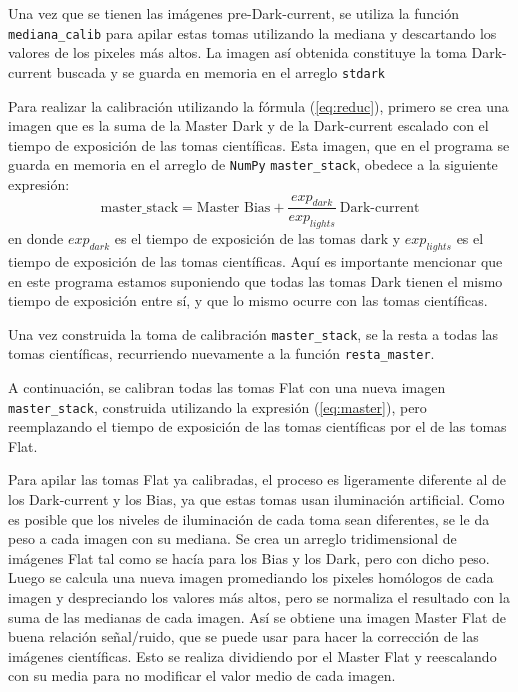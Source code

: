 \documentclass[a4paper, 12pt]{article}
\begin{document}
 Una vez que se tienen las imágenes pre-Dark-current, se utiliza la función \texttt{mediana\_calib} para apilar estas tomas utilizando la mediana y descartando los valores de los pixeles más altos. La imagen así obtenida constituye la toma Dark-current buscada y se guarda en memoria en el arreglo \texttt{stdark}

 Para realizar la calibración utilizando la fórmula (\ref{eq:reduc}), primero se crea una imagen que es la suma de la Master Dark y de la Dark-current escalado con el tiempo de exposición de las tomas científicas. Esta imagen, que en el programa se guarda en memoria en el arreglo de \texttt{NumPy} \texttt{master\_stack}, obedece a la siguiente expresión:
 \begin{equation}
   \label{eq:master}
   \mbox{master\_stack} = \mbox{Master Bias} + \frac{exp_{dark}}{exp_{lights}}\ \mbox{Dark-current}
 \end{equation}
 en donde $exp_{dark}$ es el tiempo de exposición de las tomas dark y $exp_{lights}$ es el tiempo de exposición de las tomas científicas. Aquí es importante mencionar que en este programa estamos suponiendo que todas las tomas Dark tienen el mismo tiempo de exposición entre sí, y que lo mismo ocurre con las tomas científicas.

 Una vez construida la toma de calibración \texttt{master\_stack}, se la resta a todas las tomas científicas, recurriendo nuevamente a la función \texttt{resta\_master}.

 A continuación, se calibran todas las tomas Flat con una nueva imagen \texttt{master\_stack}, construida utilizando la expresión (\ref{eq:master}), pero reemplazando el tiempo de exposición de las tomas científicas por el de las tomas Flat.

 Para apilar las tomas Flat ya calibradas, el proceso es ligeramente diferente al de los Dark-current y los Bias, ya que estas tomas usan iluminación artificial. Como es posible que los niveles de iluminación de cada toma sean diferentes, se le da peso a cada imagen con su mediana. Se crea un arreglo tridimensional de imágenes Flat tal como se hacía para los Bias y los Dark, pero con dicho peso. Luego se calcula una nueva imagen promediando los pixeles homólogos de cada imagen y despreciando los valores más altos, pero se normaliza el resultado con la suma de las medianas de cada imagen. Así se obtiene una imagen Master Flat de buena relación señal/ruido, que se puede usar para hacer la corrección de las
imágenes científicas. Esto se realiza dividiendo por el Master Flat y reescalando con su media para no modificar el valor medio
de cada imagen.
\end{document}
